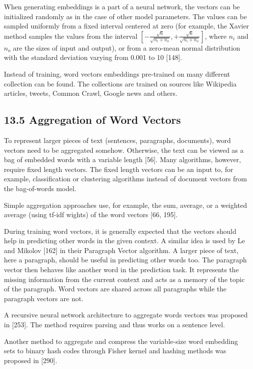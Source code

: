 \documentclass[10pt]{book}
\begin{document}
When generating embeddings is a part of a neural network, the vectors can be initialized randomly as in the case of other model parameters. The values can be sampled uniformly from a fixed interval centered at zero (for example, the Xavier method samples the values from the interval $\left[-\frac{\sqrt{6}}{\sqrt{n_{i}+n_{o}}},+\frac{\sqrt{6}}{\sqrt{n_{i}+n_{o}}}\right]$, where $n_{i}$ and $n_{o}$ are the sizes of input and output), or from a zero-mean normal distribution with the standard deviation varying from 0.001 to 10 [148].

Instead of training, word vectors embeddings pre-trained on many different collection can be found. The collections are trained on sources like Wikipedia articles, tweets, Common Crawl, Google news and others.

\subsection*{13.5 Aggregation of Word Vectors}
To represent larger pieces of text (sentences, paragraphs, documents), word vectors need to be aggregated somehow. Otherwise, the text can be viewed as a bag of embedded words with a variable length [56]. Many algorithms, however, require fixed length vectors. The fixed length vectors can be an input to, for example, classification or clustering algorithms instead of document vectors from the bag-of-words model.

Simple aggregation approaches use, for example, the sum, average, or a weighted average (using tf-idf wights) of the word vectors [66, 195].

During training word vectors, it is generally expected that the vectors should help in predicting other words in the given context. A similar idea is used by Le and Mikolov [162] in their Paragraph Vector algorithm. A larger piece of text, here a paragraph, should be useful in predicting other words too. The paragraph vector then behaves like another word in the prediction task. It represents the missing information from the current context and acts as a memory of the topic of the paragraph. Word vectors are shared across all paragraphs while the paragraph vectors are not.

A recursive neural network architecture to aggregate words vectors was proposed in [253]. The method requires parsing and thus works on a sentence level.

Another method to aggregate and compress the variable-size word embedding sets to binary hash codes through Fisher kernel and hashing methods was proposed in [290].
\end{document}
